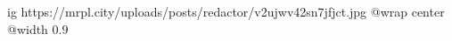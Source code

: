  
 
 
 
 

\ifcmt
  ig https://mrpl.city/uploads/posts/redactor/v2ujwv42sn7jfjct.jpg
  @wrap center
  @width 0.9
\fi

